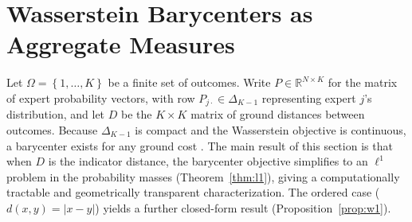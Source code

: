 \section{Wasserstein Barycenters as Aggregate Measures}
\label{sec:wbary}
Let $\Omega = \left\{1,\ldots,K\right\}$ be a finite set of outcomes.  Write $P \in \mathbb{R}^{N\times K}$ for the matrix of expert probability vectors, with row $P_{j\cdot} \in \Delta_{K-1}$ representing expert $j$'s distribution, and let $D$ be the $K\times K$ matrix of ground distances between outcomes.  Because $\Delta_{K-1}$ is compact and the Wasserstein objective is continuous, a barycenter exists for any ground cost \cite{agueh2011barycenters}.  The main result of this section is that when $D$ is the indicator distance, the barycenter objective simplifies to an $\ell^1$ problem in the probability masses (Theorem~\ref{thm:l1}), giving a computationally tractable and geometrically transparent characterization.  The ordered case ($d(x,y)=|x-y|$) yields a further closed-form result (Proposition~\ref{prop:w1}).



